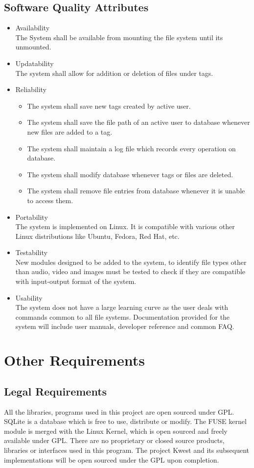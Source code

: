 \subsection {Software Quality Attributes}
\begin{itemize}
\item Availability \\
The System shall be available from mounting the file system until its unmounted.
\item Updatability \\
The system shall allow for addition or deletion of files under tags.
\item Reliability
\begin{itemize}
\item The system shall save new tags created by active user.
\item The system shall save the file path of an active user to database whenever new files are added to a tag.
\item The system shall maintain a log file which records every operation on database.
\item The system shall modify database whenever tags or files are deleted.
\item The system shall remove file entries from database whenever it is unable to access them.
\end{itemize}
\item Portability \\
The system is implemented on Linux. It is compatible with various other Linux distributions like Ubuntu, Fedora, Red Hat, etc.
\item Testability \\
New modules designed to be added to the system, to identify file types other than audio, video and images must be tested to check if they are compatible with input-output format of the system.
\item Usability \\
The system does not have a large learning curve as the user deals with commands common to all file systems. Documentation provided for the system will include user manuals, developer reference and common FAQ.
\end{itemize}

\section{Other Requirements}
\subsection{Legal Requirements}

All the libraries, programs used in this project are open sourced under GPL. SQLite is a
database which is free to use, distribute or modify. The FUSE kernel module is merged
with the Linux Kernel, which is open sourced and freely available under GPL. There
are no proprietary or closed source products, libraries or interfaces used in this program.
The project Kwest and its subsequent implementations will be open sourced under the
GPL upon completion.



